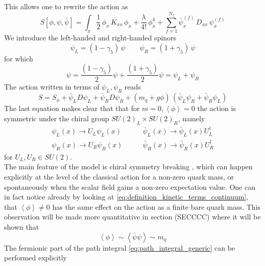 This allows one to rewrite the action as
\begin{equation*}
    S[\phi,\psi,\bar\psi] = \int_x \frac{1}{2} \, \phi_x \, K_{xx} \, \phi_x + \frac{\lambda}{4!} \, \phi_x^4 + \sum_{f=1}^{N_f} \bar\psi_x^{(f)} \, D_{xx} \, \psi_x^{(f)}
\end{equation*}
We introduce the left-handed and right-handed spinors
\begin{equation*}
	\psi_L = (1-\gamma_5) \, \psi \qquad \psi_R = (1+\gamma_5) \, \psi
\end{equation*}
for which
\begin{equation*}
	\psi = \frac{(1-\gamma_5)}{2} \psi + \frac{(1+\gamma_5)}{2} \psi = \psi_L + \psi_R
\end{equation*}
The action written in terms of $\psi_L, \psi_R$ reads
\begin{equation}
	S = S_\phi +  \bar\psi _L D \psi_L + \bar\psi _R D \psi_R + (m_q + g\phi) \,  \left(\bar\psi_L\psi_R + \bar\psi_R\psi_L\right)
	\label{eq:action_chirality_explicit}
\end{equation}
The last equation makes clear that that for $m=0,\left\langle\phi\right\rangle = 0$ the action is symmetric under the chiral group $SU(2) _L\times SU(2)_R$, namely
\begin{equation*}
	\begin{aligned}
		\psi_L(x) \to U_L\psi_L(x) &\qquad \bar\psi_L(x) \to \bar\psi_L(x) U_L^{\dagger} \\
		 \psi_R(x) \to U_R\psi_R(x) &\qquad \bar\psi_R(x) \to \bar\psi_R(x) U_R^{\dagger}
	\end{aligned}
\end{equation*}
for $U_L, U_R \in SU(2)$.\\
The main feature of the model is chiral symmetry breaking \cite{Nambu1961DynamicalI, Nambu1961DynamicalII}, which can happen explicitly at the level of the classical action for a non-zero quark mass, or spontaneously when the scalar field gains a non-zero expectation value. One can in fact notice already by looking at \eqref{eq:definition_kinetic_terms_continuum}, that $\left\langle\phi\right\rangle \neq 0$ has the same effect on the action as a finite bare quark mass. This observation will be made more quantitative in section (SECCCC) where it will be shown that  
\begin{equation*}
    \left\langle \phi \right\rangle \sim \left\langle \bar \psi \psi \right\rangle \sim m_q
\end{equation*}
The fermionic part of the path integral \eqref{eq:path_integral_generic} can be performed explicitly
